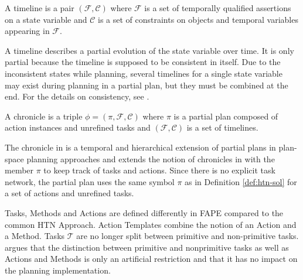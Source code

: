 \begin{definition}[Timeline]
  A timeline is a pair $(\mathcal{F},\mathcal{C})$ where $\mathcal{F}$ is a set of temporally qualified assertions on a state variable and $\mathcal{C}$ is a set of constraints on objects and temporal variables appearing in $\mathcal{F}$.
\end{definition}
A timeline describes a partial evolution of the state variable over time.
It is only partial because the timeline is supposed to be consistent in itself.
Due to the inconsistent states while planning, several timelines for a single state variable may exist during planning in a partial plan, but they must be combined at the end.
For the details on consistency, see \cite{bit-monnotTemporalHierarchicalModels2016a}.


\begin{definition}[Chronicle]
  A chronicle is a triple $\phi = (\pi,\mathcal{F},\mathcal{C})$ where $\pi$ is a partial plan composed of action instances and unrefined tasks and $(\mathcal{F},\mathcal{C})$ is a set of timelines.
\end{definition}
The chronicle in \cite{bit-monnotFAPEConstraintbasedPlanner2020} is a temporal and hierarchical extension of partial plans in plan-space planning approaches \citep[chap.~5]{ghallabAutomatedPlanningTheory2004} and extends the notion of chronicles in \cite[sec.~4.2.4]{ghallabAutomatedPlanningActing2016} with the member $\pi$ to keep track of tasks and actions.
Since there is no explicit task network, the partial plan uses the same symbol $\pi$ as in Definition \ref{def:htn-sol} for a set of actions and unrefined tasks.



Tasks, Methods and Actions are defined differently in FAPE compared to the common HTN Approach.
Action Templates combine the notion of an Action and a Method.
Tasks $\mathcal{T}$ are no longer split between primitive and non-primitive tasks.
\cite{bit-monnotTemporalHierarchicalModels2016a} argues that the distinction between primitive and nonprimitive tasks as well as Actions and Methods is only an artificial restriction and that it has no impact on the planning implementation.

